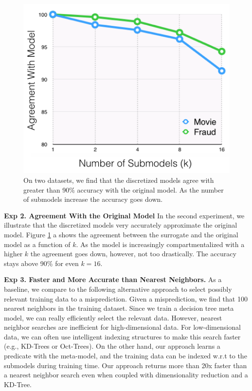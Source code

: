 \begin{figure}[ht]
    \centering
    \includegraphics[width=0.6\columnwidth]{figures/agreement.png}
    \caption{On two datasets, we find that the discretized models agree with greater than 90\% accuracy with the original model. As the number of submodels increase the accuracy goes down.}
    \label{fig:agreement}
\end{figure}

\vspace{0.5em} \noindent \textbf{Exp 2. Agreement With the Original Model}
In the second experiment, we illustrate that the discretized models very accurately approximate the original model.
Figure \ref{fig:agreement} a shows the agreement between the surrogate and the original model as a function of $k$. As the model is increasingly compartmentalized with a higher $k$ the agreement goes down, however, not too drastically. The accuracy stays above 90\% for even $k=16$.


\vspace{0.5em} \noindent \textbf{Exp 3. Faster and More Accurate than Nearest Neighbors. }  
As a baseline, we compare to the following alternative approach to select possibly relevant training data to a misprediction. Given a misprediction, we find that 100 nearest neighbors in the training dataset. Since we train a decision tree meta model, we can really efficiently select the relevant data. However, nearest neighbor searches are inefficient for high-dimensional data.
For low-dimensional data, we can often use intelligent indexing structures to make this search faster (e.g., KD-Trees or Oct-Trees).
On the other hand, our approach learns a predicate with the meta-model, and the training data can be indexed w.r.t to the submodels during training time.
Our approach returns more than 20x faster than a nearest neighbor search even when coupled with dimensionality reduction and a KD-Tree.

